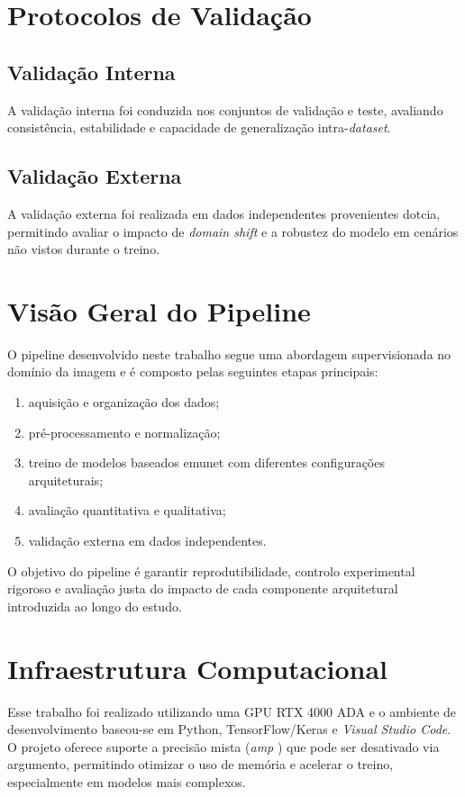 \section{Protocolos de Validação}

\subsection{Validação Interna}
A validação interna foi conduzida nos conjuntos de validação e teste, avaliando consistência, estabilidade e capacidade de generalização intra-\textit{dataset}.

\subsection{Validação Externa}
A validação externa foi realizada em dados independentes provenientes do\acrfull{tcia}, permitindo avaliar o impacto de \textit{domain shift} e a robustez do modelo em cenários não vistos durante o treino.

\section{Visão Geral do Pipeline}
O pipeline desenvolvido neste trabalho segue uma abordagem supervisionada no domínio da imagem e é composto pelas seguintes etapas principais:

\begin{enumerate}
    \item aquisição e organização dos dados;
    \item pré-processamento e normalização;
    \item treino de modelos baseados em\acrshort{unet} com diferentes configurações arquiteturais;
    \item avaliação quantitativa e qualitativa;
    \item validação externa em dados independentes.
\end{enumerate}

O objetivo do pipeline é garantir reprodutibilidade, controlo experimental rigoroso e avaliação justa do impacto de cada componente arquitetural introduzida ao longo do estudo.

\section{Infraestrutura Computacional}
Esse trabalho foi realizado utilizando uma GPU RTX 4000 ADA e o ambiente de desenvolvimento baseou-se em Python, TensorFlow/Keras e \textit{Visual Studio Code}. O projeto oferece suporte a precisão mista (\textit{\acrshort{amp}} ) que pode ser desativado via argumento, permitindo otimizar o uso de memória e acelerar o treino, especialmente em modelos mais complexos.
